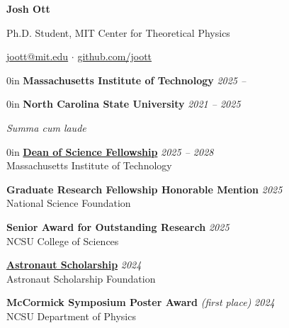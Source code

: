 \documentclass{cv}
\begin{document}
\begin{center}
    {\textbf{\LARGE Josh Ott}\par}

    \vspace{0.2em}

    Ph.D. Student, MIT Center for Theoretical Physics

    \href{mailto:joott@mit.edu}{joott@mit.edu} $\cdot$
    \href{https://www.github.com/joott}{github.com/joott}\\
\end{center}
\vspace{-0.6em}


\begin{adjustwidth}{\spacing}{0in}
    \textbf{Massachusetts Institute of Technology} \hfill \textsl{2025 --}

\end{adjustwidth}

\begin{adjustwidth}{\spacing}{0in}
    \textbf{North Carolina State University} \hfill \textsl{2021 -- 2025}


    \tabto{\bullet} \textit{Summa cum laude}
\end{adjustwidth}


\begin{adjustwidth}{\spacing}{0in}
    \href{https://science.mit.edu/about/awards/deans-fellowship-program/}
    {\textbf{Dean of Science Fellowship}}
    \hfill{\textsl{2025 -- 2028}}\\
    \tabto{\spacing} Massachusetts Institute of Technology
    \vspace{0.3em}

    \textbf{Graduate Research Fellowship Honorable Mention}
    \hfill{\textsl{2025}}\\
    \tabto{\spacing} National Science Foundation
    \vspace{0.3em}

    \textbf{Senior Award for Outstanding Research}
    \hfill{\textsl{2025}}\\
    \tabto{\spacing} NCSU College of Sciences
    \vspace{0.3em}

    \href{https://www.astronautscholarship.org/programs/astronaut-scholarship/}
    {\textbf{Astronaut Scholarship}}
    \hfill{\textsl{2024}}\\
    \tabto{\spacing} Astronaut Scholarship Foundation
    \vspace{0.3em}

    \textbf{McCormick Symposium Poster Award}
    \textit{(first place)}
    \hfill{\textsl{2024}}\\
    \tabto{\spacing} NCSU Department of Physics
\end{adjustwidth}
\vspace{0.3em}
\end{document}
